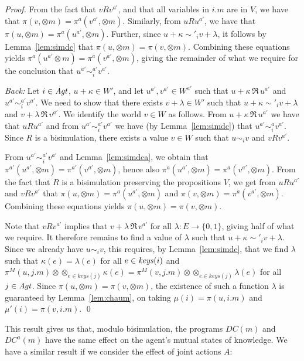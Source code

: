 \documentclass[]{llncs}
\newcommand{\xor}{\otimes}
\newcommand{\keys}{{\it keys}}
\newcommand{\Agt}{{\it Agt}}
\newcommand{\xm}{\xor m}
\begin{document}
\begin{proof}
From the fact that 
$v R v^{a'}$, and that all variables in $i.m$ are in $V$, 
we have that $\pi(v,\xm) = \pi^{a}(v^{a'},\xm)$.
Similarly, from $u R u^{a'}$, 
we have that $\pi(u,\xm) = \pi^a(u^{a'},\xm)$. 
Further, since  $u+\kappa \sim'_{i} v+\lambda$, it follows 
by Lemma~\ref{lem:simdc} that  $\pi(u,\xm) = \pi(v,\xm)$. 
Combining these equations yields $\pi^a(u^{a'}\xm) = \pi^{a}(v^{a'},\xm)$, 
giving the remainder of what we require for the conclusion that 
$u^{a'} \sim^{a'}_{i} v^{a'}$. 


\textit{Back:}  Let $i\in \Agt$, $u+\kappa \in W'$, and let $u^{a'}, v^{a'}  \in W^{a'}$ 
such that $u+\kappa \,\Re\, u^{a'}$ and  $u^{a'} \sim^{a'} _{i} v^{a'}$. 
We need to show that there exists $v + \lambda \in W'$ 
such that $u+ \kappa \sim'_i v+\lambda$ and $v+\lambda \, \Re \,v^{a'}$.
We identify the world $v\in W$ as follows. 
From $u+\kappa \,\Re\, u^{a'}$ we have  that $u R u^{a'}$ and 
from  $u^{a'} \sim^{a'} _{i} v^{a'}$ we have (by Lemma~\ref{lem:simdc})
that $u^{a'} \sim^{a} _{i} v^{a'}$. Since $R$ is a bisimulation, there exists a 
value $v\in W$ such that $u \sim_i v$  and $v R v^{a'}$. 

From $u^{a'} \sim^{a'} _{i} v^{a'}$ and Lemma~\ref{lem:simdca}, we obtain that 
$\pi^{a'}(u^{a'},\xm) = \pi^{a'}(v^{a'},\xm)$, 
hence also $\pi^{a}(u^{a'},\xm) = \pi^{a}(v^{a'},\xm)$. 
From the fact that $R$ is a bisimulation preserving the propositions $V$, 
we get from  $u R u^{a'}$ and  $v R v^{a'}$ that 
$\pi(u,\xm) = \pi^{a}(u^{a'},\xm)$ and $\pi(v,\xm) = \pi^{a}(v^{a'},\xm)$. 
Combining these equations yields $\pi(u,\xm) = \pi(v,\xm)$. 

Note that  $v R v^{a'}$  implies that $v+ \lambda \, \Re\, v^{a'}$ for all 
$\lambda: E \rightarrow \{0,1\}$, giving half of what we require. 
It therefore remains to find a value of $\lambda$ such that 
$u+ \kappa \sim'_i v+\lambda$. Since we already have $u\sim_i v$,  
 this requires, by Lemma~\ref{lem:simdc}, that we find $\lambda$ such that 
$\kappa(e) = \lambda(e)$ for all $e\in \keys(i)$ and 
$\pi^{M}(u,j.m) \xor \xor_{e\in keys(j)} \kappa(e) = \pi^{M}(v,j.m) \xor \xor_{e\in keys(j)} \lambda(e)$ for all 
$j\in \Agt$.  Since $\pi(u,\xm) = \pi(v,\xm)$, the existence of such a function $\lambda$ is guaranteed by Lemma~\ref{lem:chaum}, 
on taking $\mu(i) = \pi(u,i.m)$ and $\mu'(i) = \pi(v,i.m)$. 
\qed
\end{proof} 


This result gives us that, modulo bisimulation, the programs $DC(m)$ and $DC^a(m)$ have the
same effect on the agent's mutual states of knowledge. We have a similar result if we consider 
the effect of joint actions $A$: 
\end{document}
